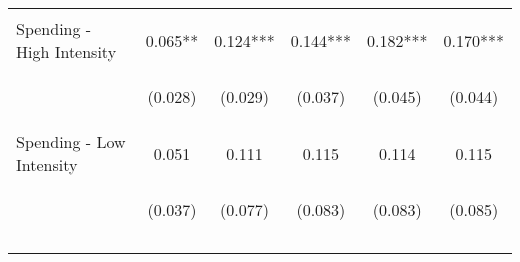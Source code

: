 \begin{tabular}{lccccc}
    \vspace{-2pt} & \vspace{-2pt} & \vspace{-2pt} & \vspace{-2pt} & \vspace{-2pt} \\ \hline
    \vspace{-1.5pt} & \vspace{-1.5pt} & \vspace{-1.5pt} & \vspace{-1.5pt} & \vspace{-1.5pt} \\
    Spending - High Intensity & 0.065** & 0.124*** & 0.144*** & 0.182*** & 0.170*** \\
    & \begin{footnotesize}(0.028)\end{footnotesize} & \begin{footnotesize}(0.029)\end{footnotesize} & \begin{footnotesize}(0.037)\end{footnotesize} & \begin{footnotesize}(0.045)\end{footnotesize} & \begin{footnotesize}(0.044)\end{footnotesize} \\
    Spending - Low Intensity & 0.051 & 0.111 & 0.115 & 0.114 & 0.115 \\
    & \begin{footnotesize}(0.037)\end{footnotesize} & \begin{footnotesize}(0.077)\end{footnotesize} & \begin{footnotesize}(0.083)\end{footnotesize} & \begin{footnotesize}(0.083)\end{footnotesize} & \begin{footnotesize}(0.085)\end{footnotesize} \\
 
    \vspace{-2pt} & \vspace{-2pt} & \vspace{-2pt} & \vspace{-2pt} & \vspace{-2pt} \\
    \vspace{-1.5pt} & \vspace{-1.5pt} & \vspace{-1.5pt} & \vspace{-1.5pt} & \vspace{-1.5pt} \\
    

\end{tabular}
